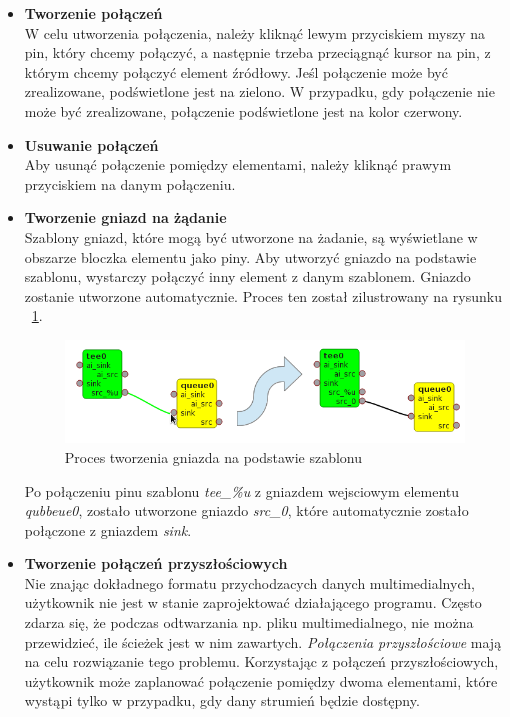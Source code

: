 \documentclass[12pt]{article}
\begin{document}
\begin{itemize}
\item \textbf{Tworzenie połączeń} \\
W celu utworzenia połączenia, należy kliknąć lewym przyciskiem myszy na pin, który chcemy połączyć, a następnie trzeba przeciągnąć kursor na pin, z którym chcemy połączyć element źródłowy. Jeśl połączenie może być zrealizowane, podświetlone jest na zielono. W przypadku, gdy połączenie nie może być zrealizowane, połączenie podświetlone jest na kolor czerwony.
\item \textbf{Usuwanie połączeń} \\ 
Aby usunąć połączenie pomiędzy elementami, należy kliknąć prawym przyciskiem na danym połączeniu.
\item \textbf{Tworzenie gniazd na żądanie} \\
Szablony gniazd, które mogą być utworzone na żadanie, są wyświetlane w obszarze bloczka elementu jako piny. Aby utworzyć gniazdo na podstawie szablonu, wystarczy połączyć inny element z danym szablonem. Gniazdo zostanie utworzone automatycznie. Proces ten został zilustrowany na rysunku ~\ref{fig:onRequestPad}.
\begin{figure}[H]
  \includegraphics[width=14cm]{img/on-request-pad.png}
  \caption{Proces tworzenia gniazda na podstawie szablonu}
  \label{fig:onRequestPad}
\end{figure}
Po połączeniu pinu szablonu \textit{tee\_\%u} z gniazdem wejsciowym elementu \textit{qubbeue0}, zostało utworzone gniazdo \textit{src\_0}, które automatycznie zostało połączone z gniazdem \textit{sink}.
\item \textbf{Tworzenie połączeń przyszłościowych} \\
Nie znając dokładnego formatu przychodzacych danych multimedialnych, użytkownik nie jest w stanie zaprojektować działającego programu. Często zdarza się, że podczas odtwarzania np. pliku multimedialnego, nie można przewidzieć, ile ścieżek jest w nim zawartych. \textit{Połączenia przyszłościowe} mają na celu rozwiązanie tego problemu. Korzystając z połączeń przyszłościowych, użytkownik może zaplanować połączenie pomiędzy dwoma elementami, które wystąpi tylko w przypadku, gdy dany strumień będzie dostępny.

\end{itemize}
\end{document}
